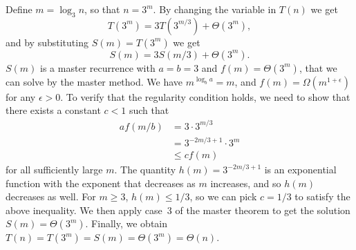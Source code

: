 Define $m=\log_3n$, so that $n=3^m$.
By changing the variable in $T(n)$ we get
\[
    T(3^m) = 3T(3^{m/3})+\Theta(3^m),
\]
and by substituting $S(m)=T(3^m)$ we get
\[
    S(m) = 3S(m/3)+\Theta(3^m).
\]
$S(m)$ is a master recurrence with $a=b=3$ and $f(m)=\Theta(3^m)$, that we can solve by the master method.
We have $m^{\log_ba}=m$, and $f(m)=\Omega(m^{1+\epsilon})$ for any $\epsilon>0$.
To verify that the regularity condition holds, we need to show that there exists a constant $c<1$ such that
\begin{align*}
    af(m/b) &= 3\cdot3^{m/3} \\
    &= 3^{-2m/3+1}\cdot3^m \\
    &\le cf(m)
\end{align*}
for all sufficiently large $m$.
The quantity $h(m)=3^{-2m/3+1}$ is an exponential function with the exponent that decreases as $m$ increases, and so $h(m)$ decreases as well.
For $m\ge3$, $h(m)\le1/3$, so we can pick $c=1/3$ to satisfy the above inequality.
We then apply case~3 of the master theorem to get the solution $S(m)=\Theta(3^m)$.
Finally, we obtain $T(n)=T(3^m)=S(m)=\Theta(3^m)=\Theta(n)$.
